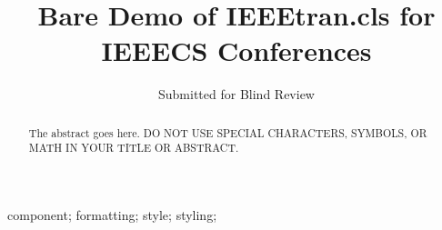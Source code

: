 \documentclass[10pt, conference, compsocconf]{IEEEtran}
\begin{document}
%
\title{Bare Demo of IEEEtran.cls for IEEECS Conferences}



\author{Submitted for Blind Review}


% 








\maketitle


\begin{abstract}
The abstract goes here. DO NOT USE SPECIAL CHARACTERS, SYMBOLS, OR MATH IN YOUR TITLE OR ABSTRACT.

\end{abstract}

\begin{IEEEkeywords}
component; formatting; style; styling;

\end{IEEEkeywords}
\end{document}
